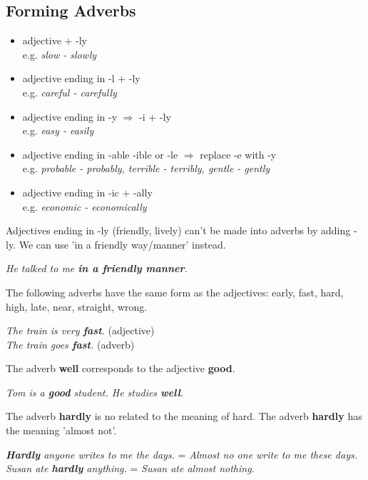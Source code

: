 \documentclass[hidelinks,10pt,a4paper]{article}
\begin{document}
\subsection{Forming Adverbs}
\begin{itemize}
	\item adjective + -ly \\
		e.g. \textit{slow - slowly}
	\item adjective ending in -l + -ly \\
		e.g. \textit{careful - carefully}
	\item adjective ending in -y $\Rightarrow$ -i + -ly \\
		e.g. \textit{easy - easily}
	\item adjective ending in -able -ible or -le $\Rightarrow$ replace -e with -y \\
		e.g. \textit{probable - probably, terrible - terribly, gentle - gently}
	\item adjective ending in -ic + -ally \\
		e.g. \textit{economic - economically}
\end{itemize}

Adjectives ending in -ly (friendly, lively) can't be made into adverbs by adding -ly. We can use 'in a friendly way/manner' instead.

\begin{center}
	\textit{He talked to me \textbf{in a friendly manner}. }
\end{center}

The following adverbs have the same form as the adjectives: early, fast, hard, high, late, near, straight, wrong.

\begin{center}
	\textit{The train is very \textbf{fast}.} (adjective) \\
	\textit{The train goes \textbf{fast}.} (adverb) \\
\end{center}

The adverb \textbf{well} corresponds to the adjective \textbf{good}.

\begin{center}
	\textit{Tom is a \textbf{good} student. He studies \textbf{well}.}
\end{center}

The adverb \textbf{hardly} is no related to the meaning of hard. The adverb \textbf{hardly} has the meaning 'almost not'.

\begin{center}
 	\textit{\textbf{Hardly} anyone writes to me the days.} = \textit{Almost no one write to me these days.} \\
	\textit{Susan ate \textbf{hardly} anything.} = \textit{Susan ate almost nothing.}
 \end{center}
\end{document}
